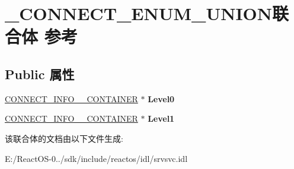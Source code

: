\hypertarget{union___c_o_n_n_e_c_t___e_n_u_m___u_n_i_o_n}{}\section{\+\_\+\+C\+O\+N\+N\+E\+C\+T\+\_\+\+E\+N\+U\+M\+\_\+\+U\+N\+I\+O\+N联合体 参考}
\label{union___c_o_n_n_e_c_t___e_n_u_m___u_n_i_o_n}
\subsection*{Public 属性}
\begin{DoxyCompactItemize}
\item 
\mbox{\label{union___c_o_n_n_e_c_t___e_n_u_m___u_n_i_o_n_af59b6512879e6dfe5c3a1d930bc20228}} 
\hyperlink{struct___c_o_n_n_e_c_t___i_n_f_o__0___c_o_n_t_a_i_n_e_r}{C\+O\+N\+N\+E\+C\+T\+\_\+\+I\+N\+F\+O\+\_\+\_\+\+C\+O\+N\+T\+A\+I\+N\+ER} $\ast$ {\bfseries Level0}
\item 
\mbox{\label{union___c_o_n_n_e_c_t___e_n_u_m___u_n_i_o_n_aae2ba36b55c30ba19251f92e1d7e96ca}} 
\hyperlink{struct___c_o_n_n_e_c_t___i_n_f_o__1___c_o_n_t_a_i_n_e_r}{C\+O\+N\+N\+E\+C\+T\+\_\+\+I\+N\+F\+O\+\_\+\_\+\+C\+O\+N\+T\+A\+I\+N\+ER} $\ast$ {\bfseries Level1}
\end{DoxyCompactItemize}


该联合体的文档由以下文件生成\+:\begin{DoxyCompactItemize}
\item 
E\+:/\+React\+O\+S-\/0../sdk/include/reactos/idl/srvsvc.\+idl\end{DoxyCompactItemize}
